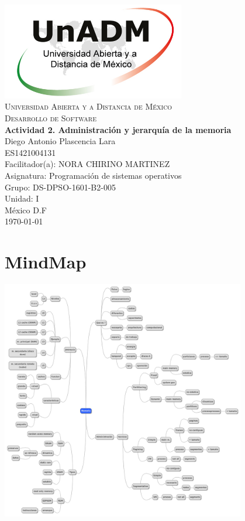 \documentclass[spanish,12pt,letterpapper]{article}
\begin{document}
	\begin{titlepage}
		\begin{center}
			\includegraphics[width=0.6\textwidth]{../logoUnADM}~\\[1cm] 
			\textsc{Universidad Abierta y a Distancia de México}\\[0.8cm]
			\textsc{Desarrollo de Software}\\[1.8cm]
			
			\textbf{ \Large Actividad 2. Administración y jerarquía de la memoria}\\[3cm]
			
			Diego Antonio Plascencia Lara\\ ES1421004131 \\[0.4cm]
			Facilitador(a): NORA CHIRINO MARTINEZ\\
			Asignatura: Programación de sistemas operativos\\
			Grupo: DS-DPSO-1601-B2-005 \\
			Unidad: I \\
			
			\vfill México D.F\\{\today}
			
		\end{center}
	\end{titlepage}
	
	\section{MindMap}
	\begin{center}
	\includegraphics[width=0.8\textwidth]{./mindmap}~\\[1cm] 
	\end{center}
\end{document}
